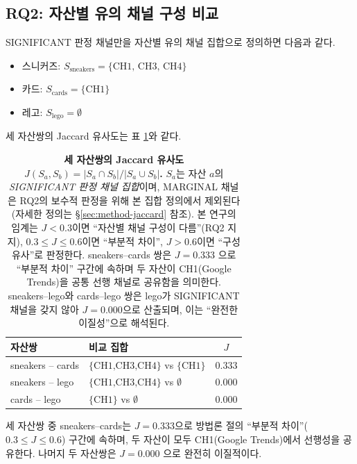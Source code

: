 \documentclass[11pt, a4paper, twocolumn]{article}
\begin{document}
\subsection{RQ2: 자산별 유의 채널 구성 비교}\label{sec:results-rq2}

SIGNIFICANT 판정 채널만을 자산별 유의 채널 집합으로 정의하면 다음과 같다.
\begin{itemize}[leftmargin=1.4em, topsep=2pt, itemsep=1pt]
  \item 스니커즈: $S_{\text{sneakers}} = \{\text{CH1, CH3, CH4}\}$
  \item 카드: $S_{\text{cards}} = \{\text{CH1}\}$
  \item 레고: $S_{\text{lego}} = \emptyset$
\end{itemize}

세 자산쌍의 Jaccard 유사도는 표 \ref{tab:jaccard}와 같다.

\begin{table}[!tbp]
\centering\small
\caption[자산쌍별 Jaccard 유사도]{\textbf{세 자산쌍의 Jaccard 유사도
$J(S_a, S_b) = |S_a \cap S_b| / |S_a \cup S_b|$.} $S_a$는 자산 $a$의
\emph{SIGNIFICANT 판정 채널 집합}이며, MARGINAL 채널은 RQ2의 보수적
판정을 위해 본 집합 정의에서 제외된다(자세한 정의는
\S\ref{sec:method-jaccard} 참조). 본 연구의 임계는 $J<0.3$이면 ``자산별
채널 구성이 다름''(RQ2 지지), $0.3 \leq J \leq 0.6$이면 ``부분적 차이'',
$J>0.6$이면 ``구성 유사''로 판정한다. sneakers--cards 쌍은 $J=0.333$
으로 ``부분적 차이'' 구간에 속하며 두 자산이 CH1(Google Trends)을
공통 선행 채널로 공유함을 의미한다. sneakers--lego와 cards--lego
쌍은 lego가 SIGNIFICANT 채널을 갖지 않아 $J=0.000$으로 산출되며, 이는
``완전한 이질성''으로 해석된다.}
\label{tab:jaccard}
\begin{tabular}{llc}
\toprule
자산쌍 & 비교 집합 & $J$ \\
\midrule
sneakers -- cards & $\{\text{CH1,CH3,CH4}\}$ vs $\{\text{CH1}\}$ & $0.333$ \\
sneakers -- lego  & $\{\text{CH1,CH3,CH4}\}$ vs $\emptyset$       & $0.000$ \\
cards -- lego     & $\{\text{CH1}\}$ vs $\emptyset$               & $0.000$ \\
\bottomrule
\end{tabular}
\end{table}

세 자산쌍 중 sneakers--cards는 $J = 0.333$으로 방법론 절의
``부분적 차이''($0.3 \leq J \leq 0.6$) 구간에 속하며, 두 자산이 모두
CH1(Google Trends)에서 선행성을 공유한다. 나머지 두 자산쌍은 $J=0.000$
으로 완전히 이질적이다.
\end{document}
